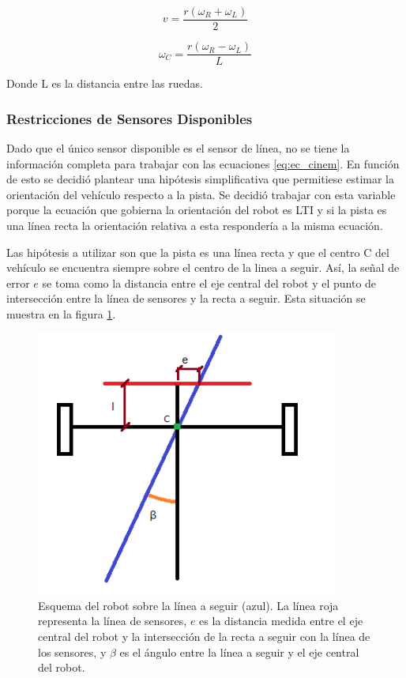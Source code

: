 \documentclass[10pt,conference,a4paper,onecolumn]{article}%
\begin{document}
\begin{equation*}
v=\frac{r(\omega _R + \omega _L)}{2}
\end{equation*}


\begin{equation}
\label{wc}
\omega_{C}=\frac{r(\omega _R - \omega _L) }{L}
\end{equation}

Donde L es la distancia entre las ruedas. 

\subsubsection{Restricciones de Sensores Disponibles}%
Dado que el único sensor disponible es el sensor de línea, no se tiene la información completa para trabajar con las ecuaciones \ref{eq:ec_cinem}. En función de esto se decidió plantear una hipótesis simplificativa que permitiese estimar la orientación del vehículo respecto a la pista. Se decidió trabajar con esta variable porque la ecuación que gobierna la orientación del robot es LTI y si la pista es una línea recta la orientación relativa a esta respondería a la misma ecuación.

Las hipótesis a utilizar son que la pista es una línea recta y que el centro C del vehículo se encuentra siempre sobre el centro de la linea a seguir. Así, la señal de error $e$ se toma como la distancia entre el eje central del robot y el punto de intersección entre la línea de sensores y la recta a seguir. Esta situación se muestra en la figura \ref{fig:carrito1}.

\begin{figure}[h]
\centering
\includegraphics[width=10cm]{./imagenes/carrito1.png}
\caption{Esquema del robot sobre la línea a seguir (azul). La línea roja representa la línea de sensores, $e$ es la distancia medida entre el eje central del robot y la intersección de la recta a seguir con la línea de los sensores, y $\beta $ es el ángulo entre la línea a seguir y el eje central del robot.}
\label{fig:carrito1}
\end{figure}
\end{document}
